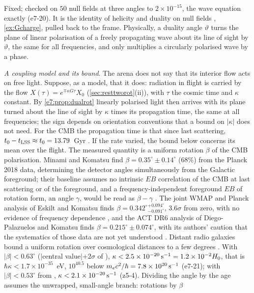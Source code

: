Fixed; checked on $50$ null fields at three angles to $2\times10^{-15}$, the wave equation exactly (e7-20). It is the identity of helicity and
duality on null fields \cite{Calkin65,PenroseRindler84}, \cref{ex:Gcharge}, pulled back to the frame. Physically, a duality angle
$\vartheta$ turns the plane of linear polarisation of a freely propagating wave about its line of sight by $\vartheta$, the same for all
frequencies, and only multiplies a circularly polarised wave by a phase.

\emph{A coupling model and its bound}. The arena does not say that its interior flow acts on free light. Suppose, as a model, that
it does: radiation in flight is carried by the flow $X(\tau)=e^{\mp\kappa G\tau}X_0$ (\cref{sec:resttworot}(ii)), with $\tau$ the cosmic
time and $\kappa$ constant. By \cref{e7:prop:dualrot} linearly polarised light then arrives with its plane turned about the line of sight by
$\kappa$ times its propagation time, the same at all frequencies; the sign depends on orientation conventions that a bound on $|\kappa|$ does not
need. For the CMB the propagation time is that since last scattering, $t_0-t_{\rm LSS}\approx t_0=13.79$~Gyr \cite{Planck18VI}. If the rate varied,
the bound below concerns its mean over the flight. The measured quantity is a uniform rotation $\beta$ of the CMB polarisation. Minami and
Komatsu find $\beta=0.35^\circ\pm0.14^\circ$ (68\%) from the Planck 2018 data, determining the detector angles simultaneously from the Galactic
foreground; their baseline assumes no intrinsic $EB$ correlation of the CMB at last scattering or of the foreground, and a frequency-independent
foreground $EB$ of rotation form, an angle $\gamma$, would be read as $\beta-\gamma$ \cite{MinamiKomatsu20}. The joint WMAP and Planck analysis of
Eskilt and Komatsu finds $\beta=0.342^\circ{}^{+0.094^\circ}_{-0.091^\circ}$, $3.6\sigma$ from zero, with no evidence of frequency dependence
\cite{EskiltKomatsu22}, and the ACT DR6 analysis of Diego-Palazuelos and Komatsu finds $\beta=0.215^\circ\pm0.074^\circ$, with its authors' caution that the
systematics of those data are not yet understood \cite{DiegoPalazuelosKomatsu26}. Distant radio galaxies bound a uniform rotation over cosmological distances to a few degrees \cite{CarrollFieldJackiw90}.
With $|\beta|<0.63^\circ$ ($|$central value$|+2\sigma$ of \cite{MinamiKomatsu20}), $\kappa<2.5\times10^{-20}\,{\rm s^{-1}}=1.2\times10^{-2}H_0$, that is
$\hbar\kappa<1.7\times10^{-35}$~eV, $10^{40.5}$ below $m_ec^2/\hbar=7.8\times10^{20}\,{\rm s^{-1}}$ (e7-21); with $|\beta|<0.53^\circ$ from
\cite{EskiltKomatsu22}, $\kappa<2.1\times10^{-20}\,{\rm s^{-1}}$ (z5-4). Dividing the angle by the age assumes the unwrapped, small-angle branch: rotations by $\beta$
